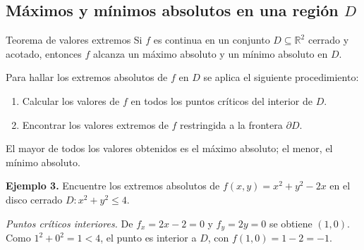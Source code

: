 \begin{center}
\shorthandoff{>}
\end{center}

\subsection{Máximos y mínimos absolutos en una región $D$}

\begin{mytheorem}{Teorema de valores extremos}
Si $f$ es continua en un conjunto $D \subseteq \mathbb{R}^2$ cerrado y acotado, entonces $f$ alcanza un máximo absoluto y un mínimo absoluto en $D$.
\end{mytheorem}

Para hallar los extremos absolutos de $f$ en $D$ se aplica el siguiente procedimiento:
\begin{enumerate}
    \item Calcular los valores de $f$ en todos los puntos críticos del interior de $D$.
    \item Encontrar los valores extremos de $f$ restringida a la frontera $\partial D$.
\end{enumerate}
El mayor de todos los valores obtenidos es el máximo absoluto; el menor, el mínimo absoluto.

\textbf{Ejemplo 3.} Encuentre los extremos absolutos de $f(x, y) = x^2 + y^2 - 2x$ en el disco cerrado $D: x^2 + y^2 \leq 4$.

\textit{Puntos críticos interiores.} De $f_x = 2x - 2 = 0$ y $f_y = 2y = 0$ se obtiene $(1, 0)$. Como $1^2 + 0^2 = 1 < 4$, el punto es interior a $D$, con $f(1, 0) = 1 - 2 = -1$.

